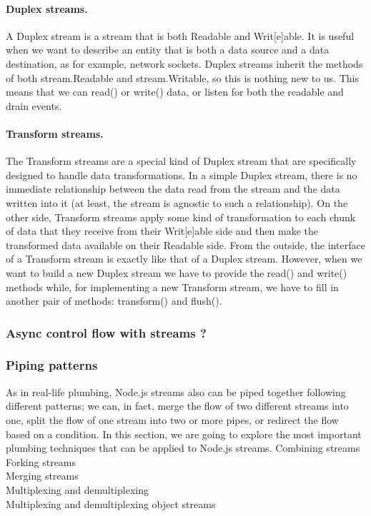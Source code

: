 \documentclass{llncs}
\begin{document}
\paragraph{Duplex streams.}
A Duplex stream is a stream that is both Readable and Writ[e]able.
It is useful when we want to describe an entity that is both a data source and a data destination, as for example, network sockets. 
Duplex streams inherit the methods of both stream.Readable and stream.Writable, so this is nothing new to us. 
This means that we can read() or write() data, or listen for both the readable and drain events.

\paragraph{Transform streams.}
The Transform streams are a special kind of Duplex stream that are specifically designed to handle data transformations.
In a simple Duplex stream, there is no immediate relationship between the data read from the stream and the data written into it (at least, the stream is agnostic to such a relationship).
On the other side, Transform streams apply some kind of transformation to each chunk of data that they receive from their Writ[e]able side and then make the transformed data available on their Readable side.
From the outside, the interface of a Transform stream is exactly like that of a Duplex stream.
However, when we want to build a new Duplex stream we have to provide the read() and write() methods while, for implementing a new Transform stream, we have to fill in another pair of methods: transform() and flush().

\subsubsection{Async control flow with streams ?}

\subsubsection{Piping patterns}
As in real-life plumbing, Node.js streams also can be piped together following different patterns; we can, in fact, merge the flow of two different streams into one, split the flow of one stream into two or more pipes, or redirect the flow based on a condition. 
In this section, we are going to explore the most important plumbing techniques that can be applied to Node.js streams.
Combining streams\\
Forking streams\\
Merging streams\\
Multiplexing and demultiplexing\\
Multiplexing and demultiplexing object streams\\
\end{document}
